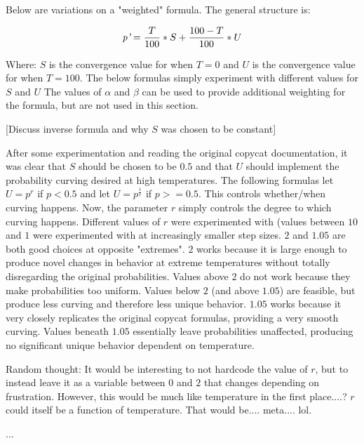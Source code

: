 \documentclass[a4paper]{article}
\begin{document}
Below are variations on a "weighted" formula.
The general structure is:

\[\emph{p'} = \frac{T}{100} * S + \frac{100-T}{100} * U\]

Where: $S$ is the convergence value for when $T = 0$ and
       $U$ is the convergence value for when $T = 100$.
The below formulas simply experiment with different values for $S$ and $U$
The values of $\alpha$ and $\beta$ can be used to provide additional weighting for the formula, but are not used in this section.



[Discuss inverse formula and why $S$ was chosen to be constant]

After some experimentation and reading the original copycat documentation, it was clear that $S$ should be chosen to be $0.5$ and that $U$ should implement the probability curving desired at high temperatures. 
The following formulas let $U = p^r$ if $p < 0.5$ and let $U = p^\frac{1}{r}$ if $p >= 0.5$.
This controls whether/when curving happens.
Now, the parameter $r$ simply controls the degree to which curving happens.
Different values of $r$ were experimented with (values between $10$ and $1$ were experimented with at increasingly smaller step sizes. 
$2$ and $1.05$ are both good choices at  opposite "extremes".
$2$ works because it is large enough to produce novel changes in behavior at extreme temperatures without totally disregarding the original probabilities.
Values above $2$ do not work because they make probabilities too uniform.
Values below $2$ (and above $1.05$) are feasible, but produce less curving and therefore less unique behavior.
$1.05$ works because it very closely replicates the original copycat formulas, providing a very smooth curving.
Values beneath $1.05$ essentially leave probabilities unaffected, producing no significant unique behavior dependent on temperature.



\newline

Random thought:
It would be interesting to not hardcode the value of $r$, but to instead leave it as a variable between $0$ and $2$ that changes depending on frustration.
However, this would be much like temperature in the first place....?
$r$ could itself be a function of temperature. That would be.... meta.... lol.

\break
...
\break
\end{document}
